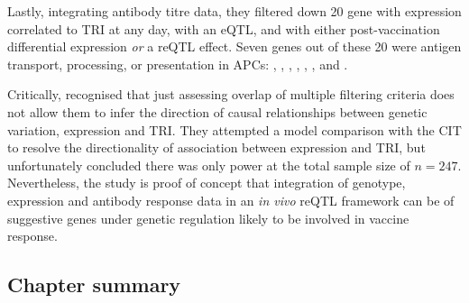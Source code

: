 Lastly, integrating antibody titre data,
they filtered down 20 gene with expression correlated to \gls{TRI} at any day, 
with an \gls{eQTL}, 
and with either post-vaccination differential expression \emph{or} a \gls{reQTL} effect.
Seven genes out of these 20 were
antigen transport, processing, or presentation in \glspl{APC}:
, , , , , , and .

Critically, \textcite{franco2013IntegrativeGenomicAnalysis} recognised that just assessing overlap of multiple filtering criteria does not allow them to infer the direction of causal relationships between genetic variation, expression and \gls{TRI}.
They attempted a model comparison with the \gls{CIT} \autocite{millstein2009DisentanglingMolecularRelationships} to resolve the directionality of association between expression and \gls{TRI}, but unfortunately concluded there was only  power at the total sample size of $n=247$.
Nevertheless, the study is proof of concept that integration of genotype, expression and antibody response data in an \textit{in vivo} \gls{reQTL} framework can be of suggestive genes under genetic regulation likely to be involved in vaccine response.

\subsection{Chapter summary}

